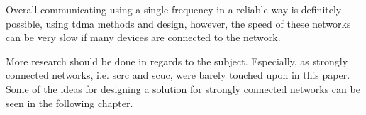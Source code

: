 \bigskip\noindent%
Overall communicating using a single frequency in a reliable way is definitely possible, using \gls{tdma} methods and design, however, the speed of these networks can be very slow if many devices are connected to the network.

More research should be done in regards to the subject.
Especially, as strongly connected networks, i.e. \gls{scrc} and \gls{scuc}, were barely touched upon in this paper.
Some of the ideas for designing a solution for strongly connected networks can be seen in the following chapter.